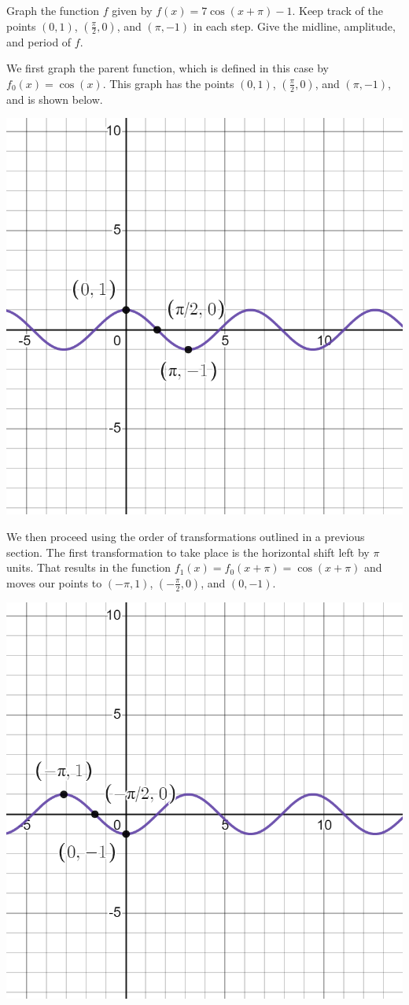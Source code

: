 \documentclass{ximera}
\begin{document}
\begin{example}
Graph the function $f$ given by $f(x) = 7\cos(x + \pi) - 1$. Keep track of the points $(0, 1)$, $\left(\frac{\pi}{2}, 0\right)$, and $(\pi, -1)$ in each step. Give the midline, amplitude, and period of $f$. 

\begin{explanation}
We first graph the parent function, which is defined in this case by $f_0(x) = \cos(x)$. This graph has the points $(0, 1)$, $\left(\frac{\pi}{2}, 0\right)$, and $(\pi, -1)$, and is shown below.
\begin{image}
\includegraphics[width=0.8\linewidth]{images/graph-ex1.png}
\end{image}

We then proceed using the order of transformations outlined in a previous section. The first transformation to take place is the horizontal shift left by $\pi$ units. That results in the function $f_1(x) = f_0(x + \pi) = \cos(x + \pi)$ and moves our points to $(-\pi, 1)$, $\left(-\frac{\pi}{2}, 0\right)$, and $(0, -1)$.
\begin{image}
\includegraphics[width=0.8\linewidth]{images/graph-ex2.png}
\end{image} 


\end{explanation}
\end{example}
\end{document}
